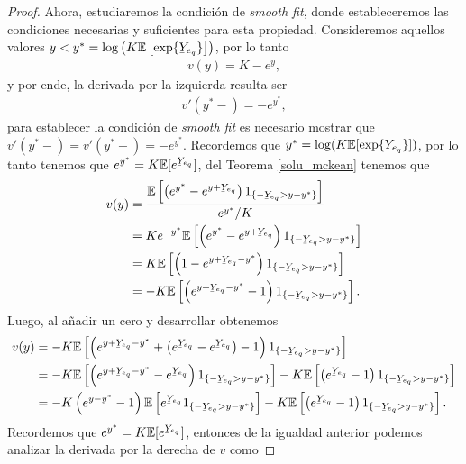 \begin{proof}
Ahora, estudiaremos la condición de \textit{smooth fit}, donde estableceremos las condiciones necesarias y suficientes para esta propiedad. Consideremos aquellos valores $y < y^{*} = \log \left( K \mathbb{E} \left[ \exp \{ \ubar{Y}_{e_q} \} \right]  \right)$, por lo tanto
\begin{align*}
v(y) = K - e^{y},
\end{align*}
y por ende, la derivada por la izquierda resulta ser
\begin{align*}
v'(y^{*} - ) = - e^{y^{*}},
\end{align*}
para establecer la condición de \textit{smooth fit} es necesario mostrar que $v'(y^{*} - ) = v'(y^{*} + ) = - e^{y^{*}}$. Recordemos que $y^{*} = \log (K \mathbb{E} [ \exp \{ \ubar{Y}_{e_q} \} ])$, por lo tanto tenemos que $e^{y^{*}} = K \mathbb{E} [ e^{ \ubar{Y}_{e_q} } ]$, del Teorema \ref{solu_mckean} tenemos que
\begin{align*}
v(y) & = \frac{ \mathbb{E} \left[ \left( e^{y^{*}} - e^{y + \ubar{Y}_{e_q}}  \right) 1_{\{ - \ubar{Y}_{e_q} > y - y^{*}\}} \right] }{ e^{y^{*}} / K } \\
	& = K e^{ - y^{*}} \mathbb{E} \left[ \left( e^{y^{*}} - e^{y + \ubar{Y}_{e_q}}  \right) 1_{\{ - \ubar{Y}_{e_q} > y - y^{*}\}} \right] \\
	& = K \mathbb{E} \left[ \left( 1 - e^{y + \ubar{Y}_{e_q} - y^{*}}  \right) 1_{\{ - \ubar{Y}_{e_q} > y - y^{*}\}} \right] \\
	& = - K \mathbb{E} \left[ \left( e^{y + \ubar{Y}_{e_q} - y^{*}} - 1  \right) 1_{\{ - \ubar{Y}_{e_q} > y - y^{*}\}} \right].
\end{align*}
Luego, al añadir un cero y desarrollar obtenemos
\begin{align*}
v(y) & = - K \mathbb{E} \left[ \left( e^{y + \ubar{Y}_{e_q} - y^{*}} + \left( e^{\ubar{Y}_{e_q}} - e^{\ubar{Y}_{e_q}} \right) - 1  \right) 1_{\{ - \ubar{Y}_{e_q} > y - y^{*}\}} \right] \\
	& = - K \mathbb{E} \left[ \left( e^{y + \ubar{Y}_{e_q} - y^{*}} - e^{\ubar{Y}_{e_q}}  \right) 1_{\{ - \ubar{Y}_{e_q} > y - y^{*}\}} \right] - K \mathbb{E} \left[ \left( e^{\ubar{Y}_{e_q}} - 1  \right) 1_{\{ - \ubar{Y}_{e_q} > y - y^{*}\}} \right] \\
	& = - K \left( e^{y - y^{*}} - 1 \right) \mathbb{E} \left[ e^{\ubar{Y}_{e_q}} 1_{\{ - \ubar{Y}_{e_q} > y - y^{*}\}} \right] - K \mathbb{E} \left[ \left( e^{\ubar{Y}_{e_q}} - 1  \right) 1_{\{ - \ubar{Y}_{e_q} > y - y^{*}\}} \right].
\end{align*}
Recordemos que $e^{y^{*}} = K \mathbb{E}[e^{\ubar{Y}_{e_q}}]$, entonces de la igualdad anterior podemos analizar la derivada por la derecha de $v$ como

\end{proof}
